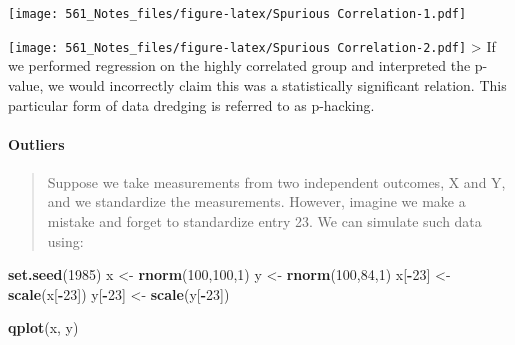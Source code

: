 \documentclass[]{article}
\newenvironment{Shaded}{\begin{snugshade}}{\end{snugshade}}
\newcommand{\CommentTok}[1]{\textcolor[rgb]{0.56,0.35,0.01}{\textit{#1}}}
\newcommand{\DataTypeTok}[1]{\textcolor[rgb]{0.13,0.29,0.53}{#1}}
\newcommand{\DecValTok}[1]{\textcolor[rgb]{0.00,0.00,0.81}{#1}}
\newcommand{\FloatTok}[1]{\textcolor[rgb]{0.00,0.00,0.81}{#1}}
\newcommand{\KeywordTok}[1]{\textcolor[rgb]{0.13,0.29,0.53}{\textbf{#1}}}
\newcommand{\NormalTok}[1]{#1}
\newcommand{\OperatorTok}[1]{\textcolor[rgb]{0.81,0.36,0.00}{\textbf{#1}}}
\newcommand{\StringTok}[1]{\textcolor[rgb]{0.31,0.60,0.02}{#1}}
\let\oldparagraph\paragraph
\renewcommand{\paragraph}[1]{\oldparagraph{#1}\mbox{}}
\begin{document}
\texttt{[image: 561\_Notes\_files/figure-latex/Spurious Correlation-1.pdf]}

\begin{Shaded}
\end{Shaded}

\texttt{[image: 561\_Notes\_files/figure-latex/Spurious Correlation-2.pdf]}
\textgreater{} If we performed regression on the highly correlated group
and interpreted the p-value, we would incorrectly claim this was a
statistically significant relation. This particular form of data
dredging is referred to as p-hacking.

\hypertarget{outliers}{%
\paragraph{Outliers}\label{outliers}}

\begin{quote}
Suppose we take measurements from two independent outcomes, X and Y, and
we standardize the measurements. However, imagine we make a mistake and
forget to standardize entry 23. We can simulate such data using:
\end{quote}

\begin{Shaded}
\begin{Highlighting}[]
\KeywordTok{set.seed}\NormalTok{(}\DecValTok{1985}\NormalTok{)}
\NormalTok{x <-}\StringTok{ }\KeywordTok{rnorm}\NormalTok{(}\DecValTok{100}\NormalTok{,}\DecValTok{100}\NormalTok{,}\DecValTok{1}\NormalTok{)}
\NormalTok{y <-}\StringTok{ }\KeywordTok{rnorm}\NormalTok{(}\DecValTok{100}\NormalTok{,}\DecValTok{84}\NormalTok{,}\DecValTok{1}\NormalTok{)}
\NormalTok{x[}\OperatorTok{-}\DecValTok{23}\NormalTok{] <-}\StringTok{ }\KeywordTok{scale}\NormalTok{(x[}\OperatorTok{-}\DecValTok{23}\NormalTok{])}
\NormalTok{y[}\OperatorTok{-}\DecValTok{23}\NormalTok{] <-}\StringTok{ }\KeywordTok{scale}\NormalTok{(y[}\OperatorTok{-}\DecValTok{23}\NormalTok{])}

\KeywordTok{qplot}\NormalTok{(x, y)}
\end{Highlighting}
\end{Shaded}
\end{document}
